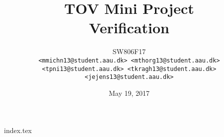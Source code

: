 \documentclass[12pt,a4paper,article,oneside]{memoir}
\title{TOV Mini Project\\Verification}
\author{SW806F17\\
\footnotesize\texttt{<mmichn13@student.aau.dk> <mthorg13@student.aau.dk> <tpni13@student.aau.dk> <tkragh13@student.aau.dk> <jejens13@student.aau.dk>}}
\date{May 19, 2017}
\begin{document}
\maketitle
{index.tex}
\end{document}
